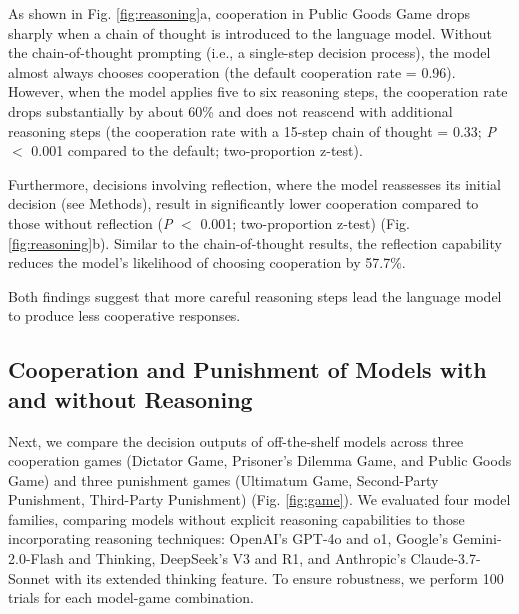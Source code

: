 As shown in Fig. \ref{fig:reasoning}a, cooperation in Public Goods Game drops sharply when a chain of thought is introduced to the language model.
Without the chain-of-thought prompting (i.e., a single-step decision process), the model almost always chooses cooperation (the default cooperation rate = 0.96).
However, when the model applies five to six reasoning steps, the cooperation rate drops substantially by about 60\% and does not reascend with additional reasoning steps (the cooperation rate with a 15-step chain of thought = 0.33; \textit{P} $<$ 0.001 compared to the default; two-proportion z-test).

Furthermore, decisions involving reflection, where the model reassesses its initial decision \cite{shinn2023reflexion} (see Methods), result in significantly lower cooperation compared to those without reflection (\textit{P} $<$ 0.001; two-proportion z-test) (Fig. \ref{fig:reasoning}b).
Similar to the chain-of-thought results, the reflection capability reduces the model’s likelihood of choosing cooperation by 57.7\%.

Both findings suggest that more careful reasoning steps lead the language model to produce less cooperative responses.


\subsection*{Cooperation and Punishment of Models with and without Reasoning}

Next, we compare the decision outputs of off-the-shelf models across three cooperation games (Dictator Game, Prisoner's Dilemma Game, and Public Goods Game) and three punishment games (Ultimatum Game, Second-Party Punishment, Third-Party Punishment) (Fig. \ref{fig:game}).
We evaluated four model families, comparing models without explicit reasoning capabilities to those incorporating reasoning techniques: OpenAI’s GPT-4o and o1, Google’s Gemini-2.0-Flash and Thinking, DeepSeek’s V3 and R1, and Anthropic's Claude-3.7-Sonnet with its extended thinking feature.
To ensure robustness, we perform 100 trials for each model-game combination.


